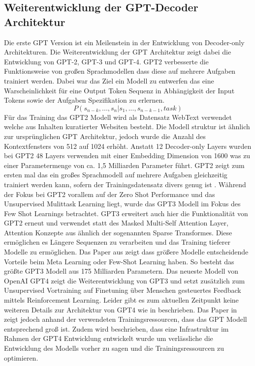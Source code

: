 \documentclass[conference]{IEEEtran}
\begin{document}
\subsection{Weiterentwicklung der GPT-Decoder Architektur}
Die erste GPT Version ist ein Meilenstein in der Entwicklung von Decoder-only Architekturen. Die Weiterentwicklung der GPT Architektur zeigt dabei die Entwicklung von GPT-2, GPT-3 und GPT-4. GPT2 verbesserte die Funktionsweise von großen Sprachmodellen dass diese auf mehrere Aufgaben trainiert werden. Dabei war das Ziel ein Modell zu entwerfen das eine Warscheinlichkeit für eine Output Token Sequenz in Abhängigkeit der Input Tokens sowie der Aufgaben Spezifikation zu erlernen.
\begin{equation}
    P(s_{n-k}, ..., s_n|s_1, ..., s_{n-k-1},task)
    \label{eq:Wahrscheinlichkeit}
\end{equation}
Für das Training das GPT2 Modell wird als Datensatz WebText verwendet welche aus Inhalten kuratierter Websiten besteht. Die Modell struktur ist ähnlich zur ursprünglichen GPT Architektur, jedoch wurde die Anzahl des Kontextfensters von 512 auf 1024 erhöht. Anstatt 12 Decoder-only Layers wurden bei GPT2 48 Layers verwenden mit einer Embedding Dimension von 1600 was zu einer Parametermenge von ca. 1,5 Milliarden Parameter führt. GPT2 zeigt zum ersten mal das ein großes Sprachmodell auf mehrere Aufgaben gleichzeitig trainiert werden kann, sofern der Trainingsdatensatz divers genug ist \cite{radfordLanguageModelsAre}. Während der Fokus bei GPT2 vorallem auf der Zero Shot Performance und das Unsupervised Mulittask Learning liegt, wurde das GPT3 Modell im Fokus des Few Shot Learnings betrachtet. GPT3 erweitert auch hier die Funktionalität von GPT2 erneut und verwendet statt des Masked Multi-Self Attention Layer, Attention Konzepte aus \cite{childGeneratingLongSequences2019} ähnlich der sogenannten Sparse Transformes. Diese ermöglichen es Längere Sequenzen zu verarbeiten und das Training tieferer Modelle zu ermöglichen. Das Paper aus \cite{brownLanguageModelsAre2020} zeigt dass größere Modelle entscheidende Vorteile beim Meta Learning oder Few-Shot Learning haben. So besteht das größte GPT3 Modell aus 175 Milliarden Parametern. Das neueste Modell von OpenAI GPT4 zeigt die Weiterentwicklung von GPT3 und setzt zusätzlich zum Unsupervised Vortraining auf Finetuning über Menschen gesteuertes Feedback mittels Reinforcement Learning. Leider gibt es zum aktuellen Zeitpunkt keine weiteren Details zur Architektur von GPT4 wie in \cite{openaiGPT4TechnicalReport2024} beschrieben. Das Paper in \cite{openaiGPT4TechnicalReport2024} zeigt jedoch anhand der verwendeten Trainingsressourcen, dass das GPT Modell entsprechend groß ist. Zudem wird beschrieben, dass eine Infrastruktur im Rahmen der GPT4 Entwicklung entwickelt wurde um verlässliche die Entwicklung des Modells vorher zu sagen und die Trainingsressourcen zu optimieren.
\end{document}
